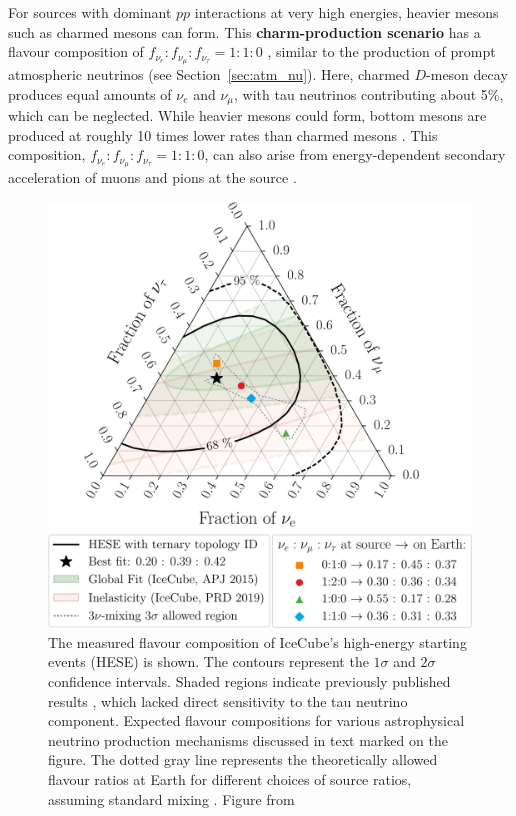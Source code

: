 For sources with dominant $pp$ interactions at very high energies, heavier mesons such as charmed mesons can form. This \textbf{charm-production scenario} has a flavour composition of $f_{\nu_e} : f_{\nu_\mu} : f_{\nu_\tau} = 1 : 1 : 0$ , similar to the production of prompt atmospheric neutrinos (see Section~\ref{sec:atm_nu}). Here, charmed $D$-meson decay produces equal amounts of $\nu_e$ and $\nu_\mu$, with tau neutrinos contributing about 5\%, which can be neglected. While heavier mesons could form, bottom mesons are produced at roughly 10 times lower rates than charmed mesons . This composition, $f_{\nu_e} : f_{\nu_\mu} : f_{\nu_\tau} = 1 : 1 : 0$, can also arise from energy-dependent secondary acceleration of muons and pions at the source .
\begin{figure}[h!]
    \caption[The measured and theoretically possible astrophysical neutrino flavour compositions at Earth]{The measured flavour composition of IceCube's high-energy starting events (HESE) is shown. The contours represent the $1\sigma$ and $2\sigma$ confidence intervals. Shaded regions indicate previously published results \cite{lars_globalfit,gary_paper}, which lacked direct sensitivity to the tau neutrino component. Expected flavour compositions for various astrophysical neutrino production mechanisms discussed in text marked on the figure. The dotted  gray line represents the theoretically allowed flavour ratios at Earth for different choices of source ratios, assuming standard mixing \cite{muon_damp}. Figure from \cite{Juliana_paper}}
    \includegraphics{./figures/nu_he/flavor_scan_7yr_steps21_inel_gf_source_shaded_serif_paper.pdf}
\end{figure}
